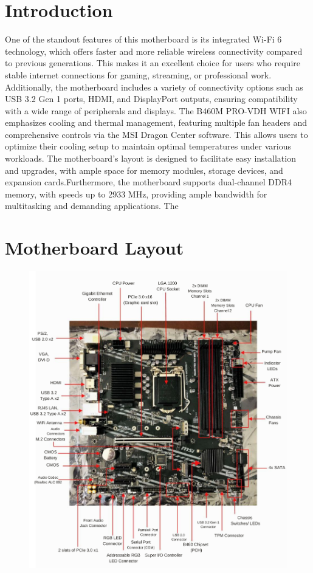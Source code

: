 \documentclass{article}
\begin{document}
\section{Introduction}

One of the standout features of this motherboard is its integrated Wi-Fi 6
technology, which offers faster and more reliable wireless connectivity
compared to previous generations. This makes it an excellent choice for
users who require stable internet connections for gaming, streaming, or
professional work. Additionally, the motherboard includes a variety of
connectivity options such as USB 3.2 Gen 1 ports, HDMI, and DisplayPort
outputs, ensuring compatibility with a wide range of peripherals and displays.
The B460M PRO-VDH WIFI also emphasizes cooling and thermal management,
featuring multiple fan headers and comprehensive controls via the MSI Dragon
Center software. This allows users to optimize their cooling setup to maintain
optimal temperatures under various workloads. The motherboard's layout is
designed to facilitate easy installation and upgrades, with ample space for
memory modules, storage devices, and expansion cards.Furthermore, the
motherboard supports dual-channel DDR4 memory, with speeds up to 2933 MHz,
providing ample bandwidth for multitasking and demanding applications. The


\section{Motherboard Layout}
\begin{figure}[ht]
\centering
\includegraphics[height=0.95\textwidth]{overview.png}
\end{figure}
\end{document}
